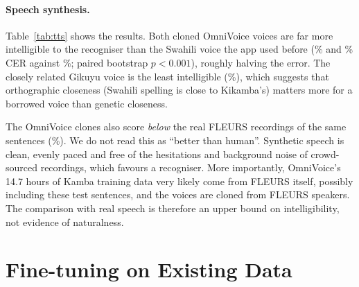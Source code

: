 \documentclass[11pt]{article}
\begin{document}
\paragraph{Speech synthesis.} Table~\ref{tab:tts} shows the results. Both cloned OmniVoice voices are far more intelligible to the recogniser than the Swahili voice the app used before (\ttsOmniFemaleCER{}\% and \ttsOmniMaleCER{}\% CER against \ttsSwhCER{}\%; paired bootstrap $p<0.001$), roughly halving the error. The closely related Gikuyu voice is the least intelligible (\ttsKikCER{}\%), which suggests that orthographic closeness (Swahili spelling is close to Kikamba's) matters more for a borrowed voice than genetic closeness.

The OmniVoice clones also score \emph{below} the real FLEURS recordings of the same sentences (\ttsRealCER{}\%). We do not read this as ``better than human''. Synthetic speech is clean, evenly paced and free of the hesitations and background noise of crowd-sourced recordings, which favours a recogniser. More importantly, OmniVoice's 14.7 hours of Kamba training data very likely come from FLEURS itself, possibly including these test sentences, and the voices are cloned from FLEURS speakers. The comparison with real speech is therefore an upper bound on intelligibility, not evidence of naturalness.

\section{Fine-tuning on Existing Data}
\label{sec:finetune}

\begin{table}[t]
\centering\small
{}
\caption{chrF++ of NLLB-200 distilled 1.3B before and after LoRA fine-tuning on existing public data. Stories: 10 children's stories held out whole. Lines are decoded without sentence splitting, so base FLORES scores differ slightly from Table~\ref{tab:mt}. A second training run with the same settings scored within 0.5 points.}
\label{tab:finetune}
\end{table}
\end{document}
